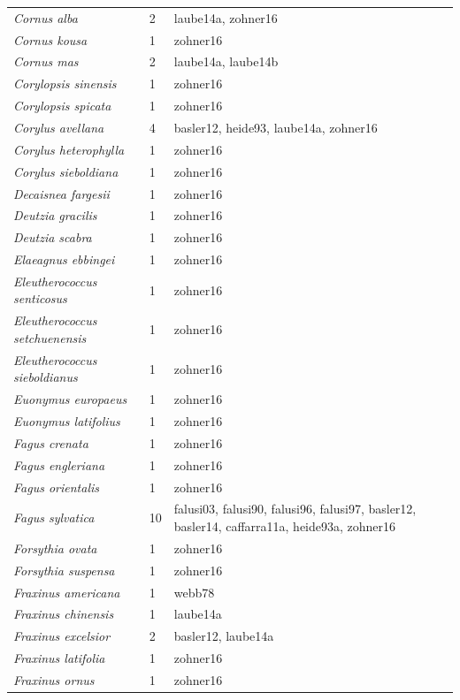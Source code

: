 \documentclass{article}
\begin{document}
\begin{footnotesize}
\begin{longtable}{p{}p{}p{}}
  \textit{Cornus alba} &   2 & laube14a, zohner16 \\ 
  \textit{Cornus kousa} &   1 & zohner16 \\ 
  \textit{Cornus mas} &   2 & laube14a, laube14b \\ 
  \textit{Corylopsis sinensis} &   1 & zohner16 \\ 
  \textit{Corylopsis spicata} &   1 & zohner16 \\ 
  \textit{Corylus avellana} &   4 & basler12, heide93, laube14a, zohner16 \\ 
  \textit{Corylus heterophylla} &   1 & zohner16 \\ 
  \textit{Corylus sieboldiana} &   1 & zohner16 \\ 
  \textit{Decaisnea fargesii} &   1 & zohner16 \\ 
  \textit{Deutzia gracilis} &   1 & zohner16 \\ 
  \textit{Deutzia scabra} &   1 & zohner16 \\ 
  \textit{Elaeagnus ebbingei} &   1 & zohner16 \\ 
  \textit{Eleutherococcus senticosus} &   1 & zohner16 \\ 
  \textit{Eleutherococcus setchuenensis} &   1 & zohner16 \\ 
  \textit{Eleutherococcus sieboldianus} &   1 & zohner16 \\ 
  \textit{Euonymus europaeus} &   1 & zohner16 \\ 
  \textit{Euonymus latifolius} &   1 & zohner16 \\ 
  \textit{Fagus crenata} &   1 & zohner16 \\ 
  \textit{Fagus engleriana} &   1 & zohner16 \\ 
  \textit{Fagus orientalis} &   1 & zohner16 \\ 
  \textit{Fagus sylvatica} &  10 & falusi03, falusi90, falusi96, falusi97, basler12, basler14, caffarra11a, heide93a, zohner16 \\ 
  \textit{Forsythia ovata} &   1 & zohner16 \\ 
  \textit{Forsythia suspensa} &   1 & zohner16 \\ 
  \textit{Fraxinus americana} &   1 & webb78 \\ 
  \textit{Fraxinus chinensis} &   1 & laube14a \\ 
  \textit{Fraxinus excelsior} &   2 & basler12, laube14a \\ 
  \textit{Fraxinus latifolia} &   1 & zohner16 \\ 
  \textit{Fraxinus ornus} &   1 & zohner16 \\ 

\end{longtable}
\end{footnotesize}
\end{document}
